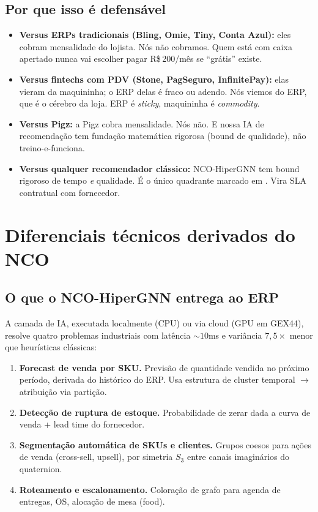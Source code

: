 \documentclass[11pt,a4paper]{article}
\begin{document}
\subsection{Por que isso é defensável}

\begin{itemize}[leftmargin=2em]
  \item \textbf{Versus ERPs tradicionais (Bling, Omie, Tiny, Conta Azul):}
        eles cobram mensalidade do lojista. Nós não cobramos. Quem está com
        caixa apertado nunca vai escolher pagar R\$\,200/mês se ``grátis''
        existe.
  \item \textbf{Versus fintechs com PDV (Stone, PagSeguro, InfinitePay):}
        elas vieram da maquininha; o ERP delas é fraco ou adendo. Nós viemos
        do ERP, que é o cérebro da loja. ERP é \emph{sticky}, maquininha é
        \emph{commodity}.
  \item \textbf{Versus Pigz:} a Pigz cobra mensalidade. Nós não. E nossa IA
        de recomendação tem fundação matemática rigorosa (bound de
        qualidade), não treino-e-funciona.
  \item \textbf{Versus qualquer recomendador clássico:} NCO-HiperGNN tem
        bound rigoroso de tempo \emph{e} qualidade. É o único quadrante
        marcado em \cite{paperAF}. Vira SLA contratual com fornecedor.
\end{itemize}

\section{Diferenciais técnicos derivados do NCO}

\subsection{O que o NCO-HiperGNN entrega ao ERP}

A camada de IA, executada localmente (CPU) ou via cloud (GPU em GEX44),
resolve quatro problemas industriais com latência $\sim 10$ms e variância
$7{,}5\times$ menor que heurísticas clássicas:

\begin{enumerate}[leftmargin=2em]
  \item \textbf{Forecast de venda por SKU.} Previsão de quantidade vendida
        no próximo período, derivada do histórico do ERP. Usa estrutura de
        cluster temporal $\to$ atribuição via partição.
  \item \textbf{Detecção de ruptura de estoque.} Probabilidade de
        zerar dada a curva de venda + lead time do fornecedor.
  \item \textbf{Segmentação automática de SKUs e clientes.} Grupos coesos
        para ações de venda (cross-sell, upsell), por simetria $S_3$ entre
        canais imaginários do quaternion.
  \item \textbf{Roteamento e escalonamento.} Coloração de grafo para
        agenda de entregas, OS, alocação de mesa (food).
\end{enumerate}
\end{document}
